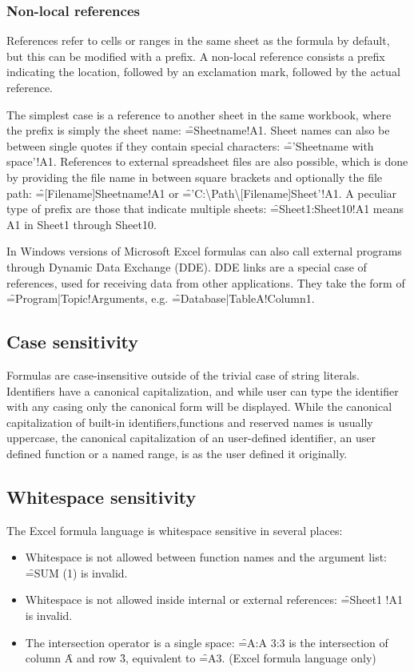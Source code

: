 \subsubsection{Non-local references}
\label{subsection:ExternalRefsDDE}

References refer to cells or ranges in the same sheet as the formula by default, but this can be modified with a prefix. A non-local reference consists a prefix indicating the location, followed by an exclamation mark, followed by the actual reference.

The simplest case is a reference to another sheet in the same workbook, where the prefix is simply the sheet name: \f{=Sheetname!A1}.
Sheet names can also be between single quotes if they contain special characters: \f{='Sheetname with space'!A1}. 
References to external spreadsheet files are also possible, which is done by providing the file name in between square brackets and optionally the file path: \f{=[Filename]Sheetname!A1} or \f{='C:{\textbackslash}Path{\textbackslash}[Filename]Sheet'!A1}.
A peculiar type of prefix are those that indicate multiple sheets: \f{=Sheet1:Sheet10!A1} means A1 in Sheet1 through Sheet10.

In Windows versions of Microsoft Excel formulas can also call external programs through Dynamic Data Exchange (DDE).
DDE links are a special case of references, used for receiving data from other applications.
They take the form of \f{=Program|Topic!Arguments}, e.g. \f{=Database|TableA!Column1}.

\subsection{Case sensitivity}

Formulas are case-insensitive outside of the trivial case of string literals.
Identifiers have a canonical capitalization, and while user can type the identifier with any casing only the canonical form will be displayed.
While the canonical capitalization of built-in identifiers,functions and reserved names is usually uppercase, the canonical capitalization of an user-defined identifier, an user defined function or a named range, is as the user defined it originally.

\subsection{Whitespace sensitivity}

The Excel formula language is whitespace sensitive in several places:
\begin{itemize}
\item Whitespace is not allowed between function names and the argument list: \f{=SUM  (1)} is invalid.
\item Whitespace is not allowed inside internal or external references: \f{=Sheet1 !A1} is invalid.
\item The intersection operator is a single space: \f{=A:A 3:3} is the intersection of column \f{A} and row \f{3}, equivalent to \f{=A3}. (Excel formula language only)
\end{itemize}


